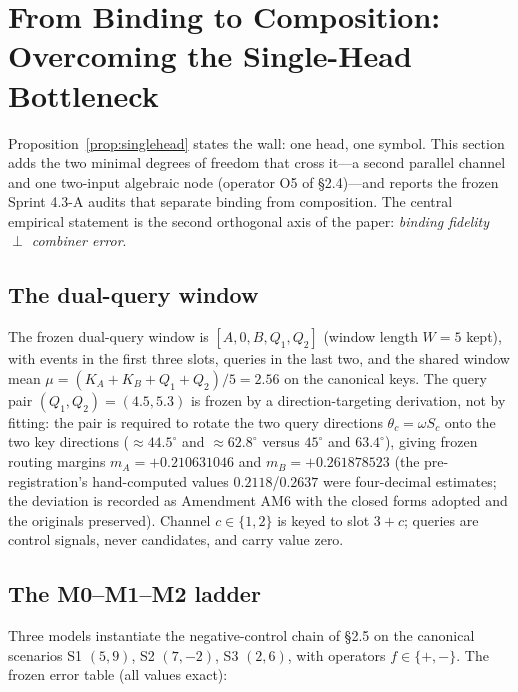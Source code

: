 \section{From Binding to Composition: Overcoming the Single-Head
Bottleneck}
\label{sec:composition}

Proposition~\ref{prop:singlehead} states the wall: one head, one symbol.
This section adds the two minimal degrees of freedom that cross it---a
second parallel channel and one two-input algebraic node (operator O5 of
§2.4)---and reports the frozen Sprint 4.3-A audits that separate binding
from composition. The central empirical statement is the second orthogonal
axis of the paper: \emph{binding fidelity $\perp$ combiner error}.

\subsection{The dual-query window}
\label{sec:dualwindow}

The frozen dual-query window is $[A,0,B,Q_1,Q_2]$ (window length $W=5$
kept), with events in the first three slots, queries in the last two, and
the shared window mean $\mu=(K_A+K_B+Q_1+Q_2)/5=2.56$ on the canonical
keys. The query pair $(Q_1,Q_2)=(4.5,5.3)$ is frozen by a
direction-targeting derivation, not by fitting: the pair is required to
rotate the two query directions $\theta_c=\omega S_c$ onto the two key
directions ($\approx44.5^{\circ}$ and $\approx62.8^{\circ}$ versus
$45^{\circ}$ and $63.4^{\circ}$), giving frozen routing margins
$m_A=+0.210631046$ and $m_B=+0.261878523$ (the pre-registration's
hand-computed values $0.2118$/$0.2637$ were four-decimal estimates; the
deviation is recorded as Amendment AM6 with the closed forms adopted and
the originals preserved). Channel $c\in\{1,2\}$ is keyed to slot $3+c$;
queries are control signals, never candidates, and carry value zero.

\subsection{The M0--M1--M2 ladder}
\label{sec:ladder8}

Three models instantiate the negative-control chain of §2.5 on the
canonical scenarios S1 $(5,9)$, S2 $(7,-2)$, S3 $(2,6)$, with operators
$f\in\{+,-\}$. The frozen error table (all values exact):

